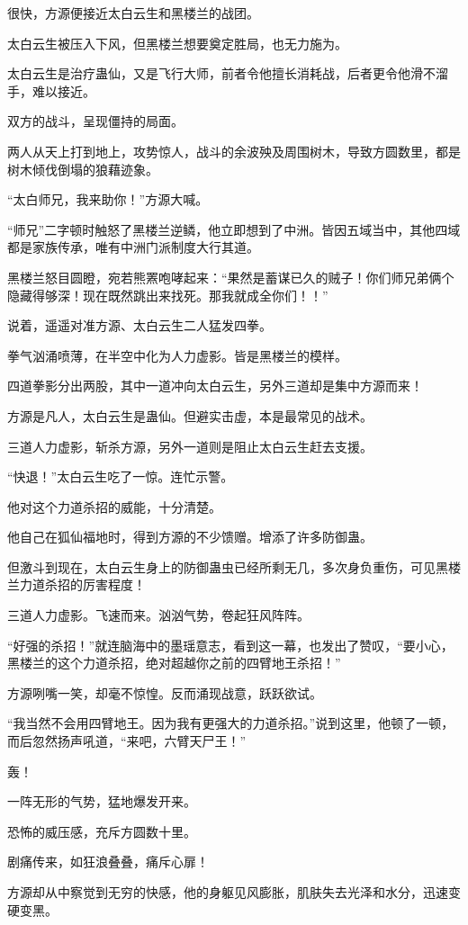 \begin{this_body}
很快，方源便接近太白云生和黑楼兰的战团。

太白云生被压入下风，但黑楼兰想要奠定胜局，也无力施为。

太白云生是治疗蛊仙，又是飞行大师，前者令他擅长消耗战，后者更令他滑不溜手，难以接近。

双方的战斗，呈现僵持的局面。

两人从天上打到地上，攻势惊人，战斗的余波殃及周围树木，导致方圆数里，都是树木倾伐倒塌的狼藉迹象。

“太白师兄，我来助你！”方源大喊。

“师兄”二字顿时触怒了黑楼兰逆鳞，他立即想到了中洲。皆因五域当中，其他四域都是家族传承，唯有中洲门派制度大行其道。

黑楼兰怒目圆瞪，宛若熊罴咆哮起来：“果然是蓄谋已久的贼子！你们师兄弟俩个隐藏得够深！现在既然跳出来找死。那我就成全你们！！”

说着，遥遥对准方源、太白云生二人猛发四拳。

拳气汹涌喷薄，在半空中化为人力虚影。皆是黑楼兰的模样。

四道拳影分出两股，其中一道冲向太白云生，另外三道却是集中方源而来！

方源是凡人，太白云生是蛊仙。但避实击虚，本是最常见的战术。

三道人力虚影，斩杀方源，另外一道则是阻止太白云生赶去支援。

“快退！”太白云生吃了一惊。连忙示警。

他对这个力道杀招的威能，十分清楚。

他自己在狐仙福地时，得到方源的不少馈赠。增添了许多防御蛊。

但激斗到现在，太白云生身上的防御蛊虫已经所剩无几，多次身负重伤，可见黑楼兰力道杀招的厉害程度！

三道人力虚影。飞速而来。汹汹气势，卷起狂风阵阵。

“好强的杀招！”就连脑海中的墨瑶意志，看到这一幕，也发出了赞叹，“要小心，黑楼兰的这个力道杀招，绝对超越你之前的四臂地王杀招！”

方源咧嘴一笑，却毫不惊惶。反而涌现战意，跃跃欲试。

“我当然不会用四臂地王。因为我有更强大的力道杀招。”说到这里，他顿了一顿，而后忽然扬声吼道，“来吧，六臂天尸王！”

轰！

一阵无形的气势，猛地爆发开来。

恐怖的威压感，充斥方圆数十里。

剧痛传来，如狂浪叠叠，痛斥心扉！

方源却从中察觉到无穷的快感，他的身躯见风膨胀，肌肤失去光泽和水分，迅速变硬变黑。


\end{this_body}
